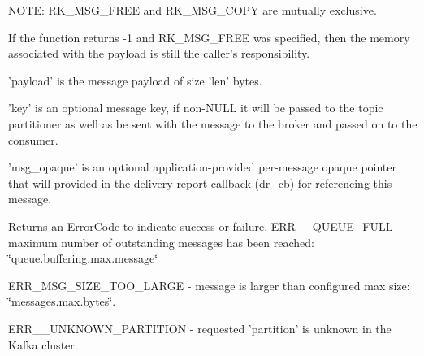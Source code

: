 N\-O\-T\-E\-: R\-K\-\_\-\-M\-S\-G\-\_\-\-F\-R\-E\-E and R\-K\-\_\-\-M\-S\-G\-\_\-\-C\-O\-P\-Y are mutually exclusive.

If the function returns -\/1 and R\-K\-\_\-\-M\-S\-G\-\_\-\-F\-R\-E\-E was specified, then the memory associated with the payload is still the caller's responsibility.

'payload' is the message payload of size 'len' bytes.

'key' is an optional message key, if non-\/\-N\-U\-L\-L it will be passed to the topic partitioner as well as be sent with the message to the broker and passed on to the consumer.

'msg\-\_\-opaque' is an optional application-\/provided per-\/message opaque pointer that will provided in the delivery report callback ({\ttfamily dr\-\_\-cb}) for referencing this message.

Returns an Error\-Code to indicate success or failure. E\-R\-R\-\_\-\-\_\-\-Q\-U\-E\-U\-E\-\_\-\-F\-U\-L\-L -\/ maximum number of outstanding messages has been reached\-: \char`\"{}queue.\-buffering.\-max.\-message\char`\"{}

E\-R\-R\-\_\-\-M\-S\-G\-\_\-\-S\-I\-Z\-E\-\_\-\-T\-O\-O\-\_\-\-L\-A\-R\-G\-E -\/ message is larger than configured max size\-: \char`\"{}messages.\-max.\-bytes\char`\"{}.

E\-R\-R\-\_\-\-\_\-\-U\-N\-K\-N\-O\-W\-N\-\_\-\-P\-A\-R\-T\-I\-T\-I\-O\-N -\/ requested 'partition' is unknown in the Kafka cluster.

